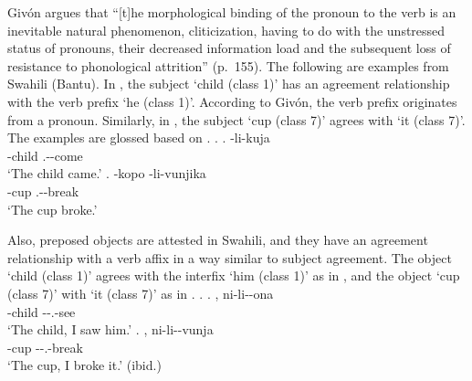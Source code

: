 Giv\'{o}n argues that
``[t]he morphological binding of the pronoun to the verb is an inevitable natural phenomenon, cliticization,
having to do with the unstressed status of pronouns, their decreased information load and the subsequent loss of resistance to phonological attrition'' (p.~155).
The following are examples from Swahili (Bantu).
In \Next[a],
the subject  `child (class 1)' has an agreement relationship with the verb prefix  `he (class 1)'.
According to Giv\'{o}n,
the verb prefix  originates from a pronoun.
Similarly, in \Next[b],
the subject  `cup (class 7)' agrees with  `it (class 7)'.
The examples are glossed based on .
%
\ex.
 \ag.  -li-kuja \\
      -child .--come \\
      `The child came.'
 \bg. -kopo -li-vunjika \\
      -cup .--break \\
      `The cup broke.'
 \hfill{\cite[157]{givon76}}

Also, preposed objects are attested in Swahili,
and they have an agreement relationship with a verb affix in a way similar to subject agreement.
The object  `child (class 1)' agrees with the interfix  `him (class 1)' as in \Next[a], and
the object  `cup (class 7)' with  `it (class 7)' as in \Next[b].
%
\ex.
 \ag. , ni-li--ona \\
      -child --.-see \\
      `The child, I saw him.'
 \bg. , ni-li--vunja \\
      -cup --.-break \\
      `The cup, I broke it.'
      \hfill{(ibid.)}
      
